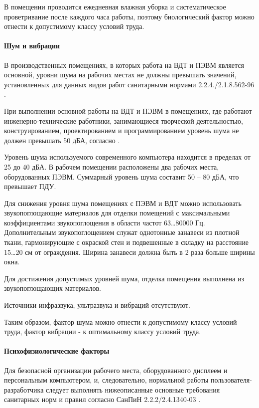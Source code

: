 В помещении проводится ежедневная влажная уборка и систематическое проветривание
после каждого часа работы, поэтому биологический фактор можно отнести к допустимому
классу условий труда.

\paragraph{Шум и вибрации}

В производственных помещениях, в которых работа на ВДТ и ПЭВМ является основной,
уровни шума на рабочих местах не должны превышать значений, установленных для
данных видов работ санитарными нормами 2.2.4./2.1.8.562-96
\cite{ecology_sanitary_norm_562_96}.

При выполнении основной работы на ВДТ и ПЭВМ в помещениях, где работают
инженерно-технические работники, занимающиеся творческой деятельностью, конструированием,
проектированием и программированием уровень шума не должен превышать 50 дБА,
согласно \cite[табл. 2]{ecology_sanitary_norm_562_96}.

Уровень шума используемого современного компьютера находится в пределах от 25 до
40 дБА. В рабочем помещении расположены два рабочих места, оборудованных ПЭВМ.
Суммарный уровень шума составит 50 – 80 дБА, что превышает ПДУ.

Для снижения уровня шума помещениях с ПЭВМ и ВДТ можно использовать звукопоглощающие
материалов для отделки помещений с максимальными коэффициентами звукопоглощения
в области частот 63…80000 Гц. Дополнительным звукопоглощением служат однотонные
занавеси из плотной ткани, гармонирующие с окраской стен и подвешенные в складку
на расстояние 15…20 см от ограждения. Ширина занавеси должна быть в 2 раза больше
ширины окна.

Для достижения допустимых уровней шума, отделка помещения выполнена из
звукопоглощающих материалов.

Источники инфразвука, ультразвука и вибраций отсутствуют.

Таким образом, фактор шума можно отнести к допустимому классу условий труда,
фактор вибрации - к оптимальному классу условий труда.

\paragraph{Психофизиологические факторы}

Для безопасной организации рабочего места, оборудованного дисплеем и персональным
компьютером, и, следовательно, нормальной работы пользователя-разработчика следует
выполнять нижеописанные основные требования санитарных норм и правил согласно
СанПиН 2.2.2/2.4.1340-03 \cite{ecology_sanpin_1340_03}.

